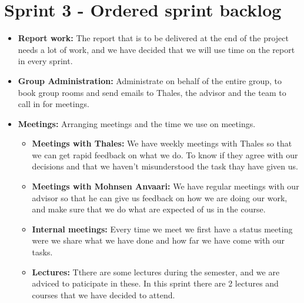 

\section{Sprint 3 - Ordered sprint backlog}

\begin{itemize}
\item{}\textbf{Report work:} The report that is to be delivered at the end of the project needs a lot of work, and we have decided that we will use time on the report in every sprint.
\item{}\textbf{Group Administration:} Administrate on behalf of the entire group, to book group rooms and send emails to Thales, the advisor and the team to call in for meetings.
\item{}\textbf{Meetings:} Arranging meetings and the time we use on meetings.
\begin{itemize}
\item{}\textbf{Meetings with Thales:} We have weekly meetings with Thales so that we can get rapid feedback on what we do. To know if they agree with our decisions and that we haven't misunderstood the task thay have given us.
\item{}\textbf{Meetings with Mohnsen Anvaari:} We have regular meetings with our advisor so that he can give us feedback on how we are doing our work, and make sure that we do what are expected of us in the course.
\item{}\textbf{Internal meetings:} Every time we meet we first have a status meeting were we share what we have done and how far we have come with our tasks.
\item{}\textbf{Lectures:} Tthere are some lectures during the semester, and we are adviced to paticipate in these. In this sprint there are 2 lectures and courses that we have decided to attend.
\end{itemize}

\newpage


\end{itemize}
